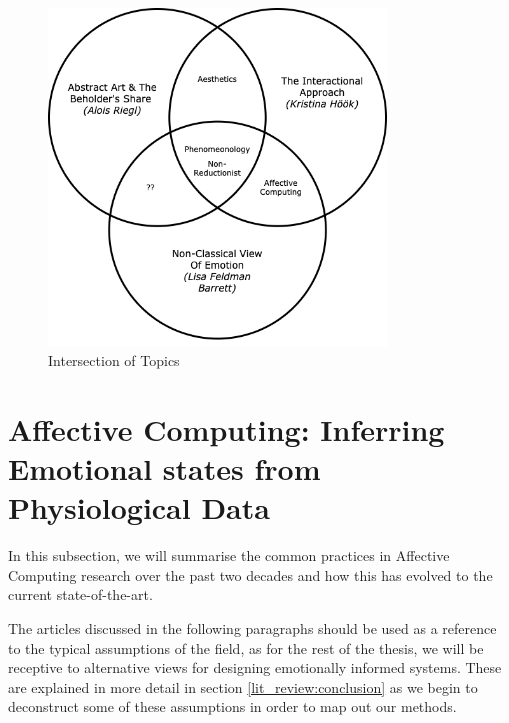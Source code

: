 \begin{figure}[htbp]
	\centering
	\includegraphics[width=0.8\textwidth]{Chapters/Figures/Concept_Venn.png}
	\caption{Intersection of Topics}
	\label{fig:Concept_Venn}
\end{figure}


\section{Affective Computing: Inferring Emotional states from Physiological Data}
\label{affective_computng_lit_review}

In this subsection, we will summarise the common practices in Affective Computing research over the past two decades and how this has evolved to the current state-of-the-art. 

The articles discussed in the following paragraphs should be used as a reference to the typical assumptions of the field, as for the rest of the thesis, we will be receptive to alternative views for designing emotionally informed systems. These are explained in more detail in section \ref{lit_review:conclusion} as we begin to deconstruct some of these assumptions in order to map out our methods. 


